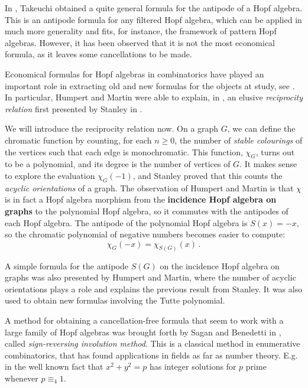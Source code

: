 \documentclass[12pt, reqno]{amsart}
\theoremstyle{definition}
\begin{document}
In \cite{Takeuchi1971}, Takeuchi obtained a quite general formula for the antipode of a Hopf algebra. 
This is an antipode formula for any filtered Hopf algebra, which can be applied in much more generality and fits, for instance, the framework of pattern Hopf algebras. 
However, it has been observed that it is not the most economical formula, as it leaves some cancellations to be made.

Economical formulas for Hopf algebras in combinatorics have played an important role in extracting old and new formulas for the objects at study, see \cite{Schmitt1993, humpert2012incidence, BS2017, aguiar2017hopf, xu2022cancellation}.
In particular, Humpert and Martin were able to explain, in \cite{humpert2012incidence}, an elusive \textit{reciprocity relation} first presented by Stanley in \cite{stanley1975combinatorial}.

We will introduce the reciprocity relation now.
On a graph $G$, we can define the chromatic function by counting, for each $n\geq 0$, the number of \textit{stable colourings} of the vertices such that each edge is monochromatic.
This function, $\chi_G$, turns out to be a polynomial, and its degree is the number of vertices of $G$.
It makes sense to explore the evaluation $\chi_G(-1)$, and Stanley proved that this counts the \textit{acyclic orientations} of a graph.
The observation of Humpert and Martin is that $\chi$ is in fact a Hopf algebra morphism from the \textbf{incidence Hopf algebra on graphs} to the polynomial Hopf algebra, so it commutes with the antipodes of each Hopf algebra.
The antipode of the polynomial Hopf algebra is $S(x) = -x$, so the chromatic polynomial of negative numbers becomes easier to compute:
$$\chi_G(-x) = \chi_{S(G)}(x)\, .$$

A simple formula for the antipode $S(G)$ on the incidence Hopf algebra on graphs was also presented by Humpert and Martin, where the number of acyclic orientations plays a role and explains the previous result from Stanley.
It was also used to obtain new formulas involving the Tutte polynomial.

A method for obtaining a cancellation-free formula that seem to work with a large family of Hopf algebras was brought forth by Sagan and Benedetti in \cite{BS2017}, called \textit{sign-reversing involution method}.
This is a classical method in enumerative combinatorics, that has found applications in fields as far as number theory. 
E.g. in \cite{zagier2009one} the well known fact that $x^2+y^2 = p$ has integer solutions for $p$ prime whenever $p\equiv_4 1$.
\end{document}
